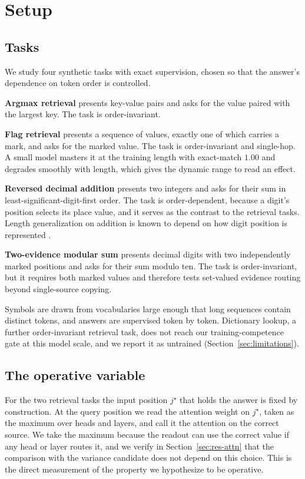 \documentclass[letterpaper]{article} %
\begin{document}
\section{Setup}
\label{sec:setup}

\subsection{Tasks}

We study four synthetic tasks with exact supervision, chosen so that the answer's dependence on token
order is controlled.

\textbf{Argmax retrieval} presents key-value pairs and asks for the value paired with the largest key.
The task is order-invariant.

\textbf{Flag retrieval} presents a sequence of values, exactly one of which carries a mark, and asks for
the marked value.
The task is order-invariant and single-hop.
A small model masters it at the training length with exact-match $1.00$ and degrades smoothly with length,
which gives the dynamic range to read an effect.

\textbf{Reversed decimal addition} presents two integers and asks for their sum in
least-significant-digit-first order.
The task is order-dependent, because a digit's position selects its place value, and it serves as the
contrast to the retrieval tasks.
Length generalization on addition is known to depend on how digit position is represented \citep{mcleish}.

\textbf{Two-evidence modular sum} presents decimal digits with two independently marked positions and asks
for their sum modulo ten.
The task is order-invariant, but it requires both marked values and therefore tests set-valued evidence
routing beyond single-source copying.

Symbols are drawn from vocabularies large enough that long sequences contain distinct tokens, and answers
are supervised token by token.
Dictionary lookup, a further order-invariant retrieval task, does not reach our training-competence gate at
this model scale, and we report it as untrained (Section~\ref{sec:limitations}).

\subsection{The operative variable}

For the two retrieval tasks the input position $j^\star$ that holds the answer is fixed by construction.
At the query position we read the attention weight on $j^\star$, taken as the maximum over heads and layers,
and call it the attention on the correct source.
We take the maximum because the readout can use the correct value if any head or layer routes it, and we
verify in Section~\ref{sec:res-attn} that the comparison with the variance candidate does not depend on
this choice.
This is the direct measurement of the property we hypothesize to be operative.
\end{document}
